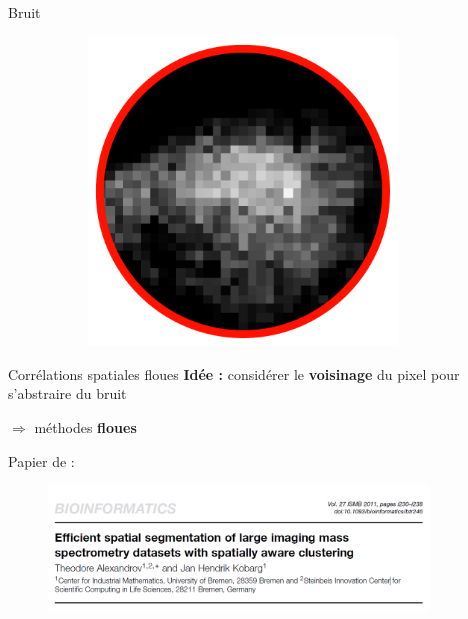 \documentclass[10pt]{beamer}
\begin{document}
\begin{frame}{Bruit}
\begin{figure}[ht]
\begin{subfigure}[t]{0.33\textwidth}
      \caption{}
      \label{subfig:cluster2}
    \end{subfigure}%
     \begin{subfigure}[t]{0.33\textwidth}
      \centering
      \includegraphics[width=0.90\textwidth]{fig/nmf_components_2_closeup2}
      \caption{}
      \label{subfig:cluster1}
    \end{subfigure}%
  \end{figure}

\end{frame}


\begin{frame}{Corrélations spatiales floues}
  \textbf{Idée :} considérer le \textbf{voisinage} du pixel pour s'abstraire du bruit

  $\Rightarrow$ méthodes \textbf{floues} \vspace{0.4cm}

  Papier de \cite{Alexandrov11} :

  \begin{figure}[ht]
    \centering
    \includegraphics[width=0.9\textwidth]{fig/article_front}
    \caption{}
    \label{fig:article_front}
  \end{figure}
  
\end{frame}
\end{document}

